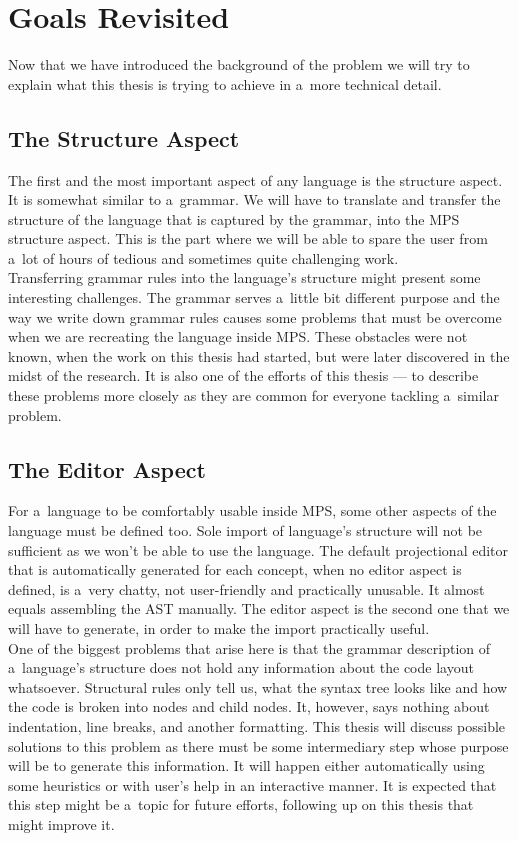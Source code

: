 \chapter{Goals Revisited}

Now that we have introduced the background of the problem we will try to explain what this thesis is trying to achieve in a~more technical detail.

\section{The Structure Aspect}
The first and the most important aspect of any language is the structure aspect.
It is somewhat similar to a~grammar.
We will have to translate and transfer the structure of the language that is captured by the grammar, into the MPS structure aspect.
This is the part where we will be able to spare the user from a~lot of hours of tedious and sometimes quite challenging work.
\\

Transferring grammar rules into the language's structure might present some interesting challenges.
The grammar serves a~little bit different purpose and the way we write down grammar rules causes some problems that must be overcome when we are recreating the language inside MPS.
These obstacles were not known, when the work on this thesis had started, but were later discovered in the midst of the research.
It is also one of the efforts of this thesis --- to describe these problems more closely as they are common for everyone tackling a~similar problem.

\section{The Editor Aspect}
For a~language to be comfortably usable inside MPS, some other aspects of the language must be defined too.
Sole import of language's structure will not be sufficient as we won't be able to use the language.
The default projectional editor that is automatically generated for each concept, when no editor aspect is defined, is a~very chatty, not user-friendly and practically unusable.
It almost equals assembling the AST manually.
The editor aspect is the second one that we will have to generate, in order to make the import practically useful.
\\

One of the biggest problems that arise here is that the grammar description of a~language's structure does not hold any information about the code layout whatsoever.
Structural rules only tell us, what the syntax tree looks like and how the code is broken into nodes and child nodes.
It, however, says nothing about indentation, line breaks, and another formatting.
This thesis will discuss possible solutions to this problem as there must be some intermediary step whose purpose will be to generate this information.
It will happen either automatically using some heuristics or with user's help in an interactive manner.
It is expected that this step might be a~topic for future efforts, following up on this thesis that might improve it.


